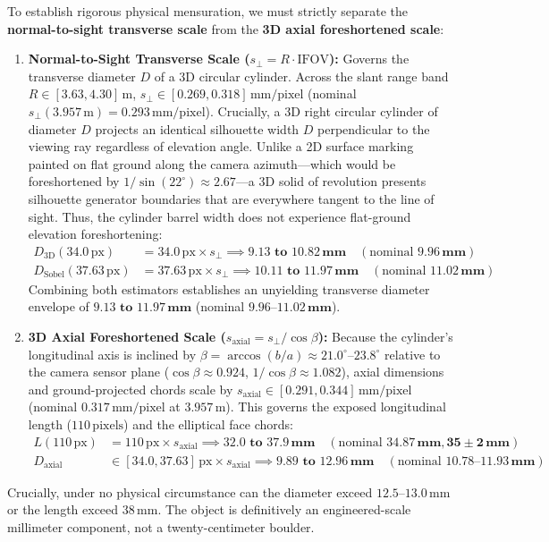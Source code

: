 \documentclass[11pt,a4paper]{article}
\begin{document}
To establish rigorous physical mensuration, we must strictly separate the \textbf{normal-to-sight transverse scale} from the \textbf{3D axial foreshortened scale}:
\begin{enumerate}
	\item \textbf{Normal-to-Sight Transverse Scale ($s_\perp = R \cdot \text{IFOV}$):} Governs the transverse diameter $D$ of a 3D circular cylinder. Across the slant range band $R \in [3.63, 4.30]\,\text{m}$, $s_\perp \in [0.269, 0.318]\,\text{mm/pixel}$ (nominal $s_\perp(3.957\,\text{m}) = 0.293\,\text{mm/pixel}$). Crucially, a 3D right circular cylinder of diameter $D$ projects an identical silhouette width $D$ perpendicular to the viewing ray regardless of elevation angle. Unlike a 2D surface marking painted on flat ground along the camera azimuth---which would be foreshortened by $1/\sin(22^\circ) \approx 2.67$---a 3D solid of revolution presents silhouette generator boundaries that are everywhere tangent to the line of sight. Thus, the cylinder barrel width does not experience flat-ground elevation foreshortening:
	\begin{align}
		D_{\text{3D}} (34.0\,\text{px})     & = 34.0\,\text{px} \times s_\perp \implies \mathbf{9.13\text{ to } 10.82\,\text{mm}} \quad (\text{nominal } \mathbf{9.96\,\text{mm}}) \\
		D_{\text{Sobel}} (37.63\,\text{px}) & = 37.63\,\text{px} \times s_\perp \implies \mathbf{10.11\text{ to } 11.97\,\text{mm}} \quad (\text{nominal } \mathbf{11.02\,\text{mm}})
	\end{align}
	Combining both estimators establishes an unyielding transverse diameter envelope of $\mathbf{9.13\text{ to } 11.97\,\text{mm}}$ (nominal $\mathbf{9.96\text{--}11.02\,\text{mm}}$).
	\item \textbf{3D Axial Foreshortened Scale ($s_{\text{axial}} = s_\perp / \cos\beta$):} Because the cylinder's longitudinal axis is inclined by $\beta = \arccos(b/a) \approx 21.0^\circ\text{--}23.8^\circ$ relative to the camera sensor plane ($\cos\beta \approx 0.924$, $1/\cos\beta \approx 1.082$), axial dimensions and ground-projected chords scale by $s_{\text{axial}} \in [0.291, 0.344]\,\text{mm/pixel}$ (nominal $0.317\,\text{mm/pixel}$ at $3.957\,\text{m}$). This governs the exposed longitudinal length ($110\,\text{pixels}$) and the elliptical face chords:
	\begin{align}
		L (110\,\text{px}) & = 110\,\text{px} \times s_{\text{axial}} \implies \mathbf{32.0\text{ to } 37.9\,\text{mm}} \quad (\text{nominal } \mathbf{34.87\,\text{mm}}, \mathbf{35 \pm 2\,\text{mm}}) \\
		D_{\text{axial}}   & \in [34.0, 37.63]\,\text{px} \times s_{\text{axial}} \implies \mathbf{9.89\text{ to } 12.96\,\text{mm}} \quad (\text{nominal } \mathbf{10.78\text{--}11.93\,\text{mm}})
	\end{align}
\end{enumerate}
Crucially, under no physical circumstance can the diameter exceed $12.5\text{--}13.0\,\text{mm}$ or the length exceed $38\,\text{mm}$. The object is definitively an engineered-scale millimeter component, not a twenty-centimeter boulder.
\end{document}
